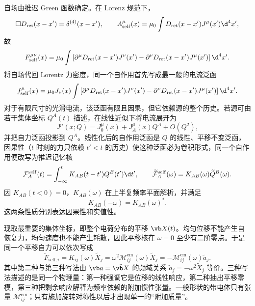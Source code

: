 自场由推迟 Green 函数确定。在 Lorenz 规范下，
\begin{equation*}
 \Box D_{\mathrm{ret}}(x-x')=\delta^{(4)}(x-x'),
 \qquad
 A_{\mathrm{self}}^\mu(x)
 =\mu_0\int D_{\mathrm{ret}}(x-x')J^\mu(x')\d^4x',
\end{equation*}
故
\begin{equation*}
 F_{\mathrm{self}}^{\mu\nu}(x)
 =\mu_0\int
 \left[
 \partial^\mu D_{\mathrm{ret}}(x-x')J^\nu(x')
 -\partial^\nu D_{\mathrm{ret}}(x-x')J^\mu(x')
 \right]\d^4x'.
\end{equation*}
将自场代回 Lorentz 力密度，同一个自作用首先写成最一般的电流泛函
\begin{equation*}
 f_{\mathrm{self}}^\mu(x)
 =\mu_0J_\nu(x)\int
 \left[
 \partial^\mu D_{\mathrm{ret}}(x-x')J^\nu(x')
 -\partial^\nu D_{\mathrm{ret}}(x-x')J^\mu(x')
 \right]\d^4x'.
\end{equation*}
对于有限尺寸的光滑电流，该泛函有限且因果，但它依赖源的整个历史。若源可由若干集体坐标 $Q^A(t)$ 描述，在线性近似下将电流展开为
\begin{equation*}
 J^\mu(x;Q)=J_0^\mu(x)+J_A^\mu(x)Q^A+O(Q^2),
\end{equation*}
并把自力泛函投影到 $Q^A$。线性化后的自作用泛函是 $Q$ 的线性、平移不变泛函，因果性（$t$ 时刻的力只依赖 $t'<t$ 的历史）使这种泛函必为卷积形式，同一个自作用便改写为推迟记忆核
\begin{equation*}
 \mathcal F_A^{\mathrm{self}}(t)
 =\int_{-\infty}^tK_{AB}(t-t')Q^B(t')\d t',
 \qquad
 \widetilde{\mathcal F}_A^{\mathrm{self}}(\omega)
 =K_{AB}(\omega)\widetilde Q^B(\omega).
\end{equation*}
因 $K_{AB}(t<0)=0$，$K_{AB}(\omega)$ 在上半复频率平面解析，并满足
\begin{equation*}
 K_{AB}(-\omega)=K_{AB}(\omega)^*.
\end{equation*}
这两条性质分别表达因果性和实值性。

现取最重要的集体坐标，即整个电荷分布的平移 $\vb X(t)$。均匀位移不能产生自恢复力，均匀速度也不能产生耗散，因此平移核在 $\omega=0$ 至少有二阶零点。于是同一个平移自力可以依次写成
\begin{equation*}
 \widetilde F_{\mathrm{self},i}
 =K_{ij}(\omega)\widetilde X_j
 =\omega^2\mathcal M_{ij}^{\mathrm{em}}(\omega)\widetilde X_j
 =-\mathcal M_{ij}^{\mathrm{em}}(\omega)\widetilde a_j.
\end{equation*}
其中第二种与第三种写法由 $\vb a=\ddot{\vb X}$ 的频域关系 $\widetilde a_j=-\omega^2\widetilde X_j$ 等价。三种写法描述的是同一个物理量：第一种强调它是位移的线性响应，第二种抽出平移零模，第三种把剩余响应解释为频率依赖的附加惯性张量。一般形状的带电体只有张量 $\mathcal M_{ij}^{\mathrm{em}}$；只有施加旋转对称性以后才出现单一的“附加质量”。

